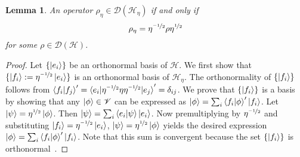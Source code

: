 \documentclass[amsmath,amssymb,aps,pra,superscriptaddress,twocolumn]{revtex4-2}
\newtheorem{lemma}[theorem]{Lemma}
\begin{document}
\begin{appendix}
\begin{lemma}
   An operator $\rho_\eta \in\mathcal{D}\left(\mathscr{H}_\eta\right) $ if and only if
   \begin{equation}\label{eq:rho_eta}
       \rho_\eta = \eta^{\nicefrac{-1}{2}}\rho \eta^{\nicefrac{1}{2}}
   \end{equation}
    for some  $\rho \in\mathcal{D}\left(\mathscr{H}\right)$.
    \end{lemma}
\begin{proof}
Let $\{\ket{e_i}\}$ be an orthonormal basis of $\mathscr{H}$. We first show that $\{\ket{f_i}:= \eta^{\nicefrac{-1}{2}}\ket{e_i}\}$
is an orthonormal basis of $\mathscr{H}_\eta$. The orthonormality of $\{\ket{f_i}\}$ follows from 
$\braket{f_i|f_j}' = \braket{e_i|\eta^{\nicefrac{-1}{2}}\eta\eta^{\nicefrac{-1}{2}} |e_j}' = \delta_{ij}$. 
We prove that $\{\ket{f_i}\}$ is a basis by showing that any $\ket{\phi} \in \mathscr{V}$ can be expressed
as $\ket{\phi} = \sum_i \braket{f_i|\phi}'\ket{f_i}$. Let $\ket{\psi} = \eta^{\nicefrac{1}{2}}\ket{\phi}$.
Then $\ket{\psi} = \sum_i \braket{e_i|\psi}\ket{e_i}$. Now premultiplying by $\eta^{\nicefrac{-1}{2}}$ and substituting
$\ket{f_i} = \eta^{\nicefrac{-1}{2}}\ket{e_i}$, $\ket{\psi} = \eta^{\nicefrac{1}{2}}\ket{\phi}$ yields 
the desired expression $\ket{\phi} = \sum_i \braket{f_i|\phi}'\ket{f_i}$. Note that this sum is convergent because
the set $\{\ket{f_i}\}$ is orthonormal~\cite{Con07}.


\end{proof}
\end{appendix}
\end{document}
